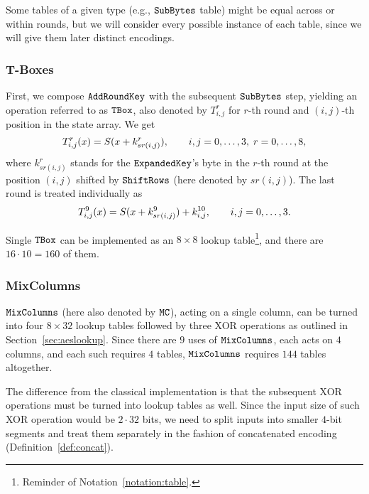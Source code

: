 \begin{note}
\label{note:tableinst}
	Some tables of a given type (e.g., $\texttt{SubBytes}$ table) might be equal across or within rounds, but we will consider every possible instance of each table, since we will give them later distinct encodings.
\end{note}

\subsubsection{T-Boxes}
	
	First, we compose $\texttt{AddRoundKey}$ with the subsequent $\texttt{SubBytes}$ step, yielding an operation referred to as $\texttt{TBox}$, also denoted by $T_{i,j}^r$ for $r$-th round and $(i,j)$-th position in the state array. We get
	\begin{equation*}
		T_{i,j}^r(x) = S(x+k_{sr(i,j)}^r) , \qquad i,j=0 , \ldots , 3,\;r=0 , \ldots , 8 ,
	\end{equation*}
	where $k_{sr(i,j)}^r$ stands for the $\texttt{ExpandedKey}$'s byte in the $r$-th round at the position $(i,j)$ shifted by $\texttt{ShiftRows}$ (here denoted by $sr(i,j)$). The last round is treated individually as
	\begin{equation}
	\label{eq:lasttbox}
		T_{i,j}^{9}(x) = S(x+k_{sr(i,j)}^9) + k_{i,j}^{10} , \qquad i,j=0 , \ldots , 3 .
	\end{equation}
	
	Single $\texttt{TBox}$ can be implemented as an $8\times 8$ lookup table\footnote{Reminder of Notation~\ref{notation:table}.}, and there are $16\cdot 10 = 160$ of them.

\subsubsection{MixColumns}
	
	$\texttt{MixColumns}$ (here also denoted by $\texttt{MC}$), acting on a single column, can be turned into four $8\times 32$ lookup tables followed by three XOR operations as outlined in Section~\ref{sec:aeslookup}. Since there are $9$ uses of $\texttt{MixColumns}$, each acts on $4$ columns, and each such requires $4$ tables, $\texttt{MixColumns}$ requires $144$ tables altogether.
	
	The difference from the classical implementation is that the subsequent XOR operations must be turned into lookup tables as well. Since the input size of such XOR operation would be $2\cdot 32$ bits, we need to split inputs into smaller $4$-bit segments and treat them separately in the fashion of concatenated encoding (Definition~\ref{def:concat}).
	
